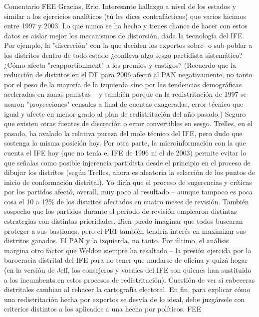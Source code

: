 \documentclass[letter,12pt]{article}
\begin{document}
Comentario FEE Gracias, Eric.  Interesante hallazgo a nivel de los estados y similar a los ejercicios analíticos (tú les dices contrafácticos) que varios hicimos entre 1997 y 2003.  Lo que nunca se ha hecho y tienes chance de hacer con estos datos es aislar mejor los mecanismos de distorsión, dada la tecnología del IFE.  Por ejemplo, la "discreción" con la que deciden los expertos sobre- o sub-poblar a los distritos dentro de todo estado ¿conlleva algo sesgo partidista sistemático?  ¿Cómo afecta "reapportionment" a los premios y castigos? (Recuerdo que la reducción de distritos en el DF para 2006 afectó al PAN negativamente, no tanto por el peso de la mayoría de la izquierda sino por las tendencias demográficas aceleradas en zonas panistas -- y también porque en la redistritación de 1997 se usaron "proyecciones" censales a final de cuentas exageradas, error técnico que igual y afecte en menor grado al plan de redistritación del año pasado.)  Seguro que existen otras fuentes de discreción o error convertibles en sesgo.  Trelles, en el pasado, ha avalado la relativa pureza del mole técnico del IFE, pero dudo que sostenga la misma posición hoy.  Por otra parte, la microinformación con la que cuenta el IFE hoy (que no tenía el IFE de 1996 ni el de 2003) permite evitar lo que señalas como posible injerencia partidista desde el principio en el proceso de dibujar los distritos (según Trelles, ahora es aleatoria la selección de los puntos de inicio de conformación   distrital).  Yo diría que el proceso de sugerencias y críticas por los partidos afectó, overall, muy poco al resultado -- aunque tampoco es poca cosa el 10 a 12\% de los distritos afectados en cuatro meses de revisión. También sospecho que los partidos durante el período de revisión emplearon distintas estrategias con distintas prioridades.  Bien puedo imaginar que todos buscaran proteger a sus bastiones, pero el PRI también tendría interés en maximizar sus distritos ganados.  El PAN y la izquierda, no tanto.  Por último, el análisis margina otro factor que Weldon siempre ha resaltado -- la presión ejercida por la burocracia distrital del IFE para no tener que mudarse de oficina y quizá hogar (en la versión de Jeff, los consejeros y vocales del IFE son quienes han sustituido a los incumbents en estos procesos de redistritación).  Cuestión de ver si cabeceras distritales cambian al rehacer la cartografía electoral.  En fin, para explicar cómo una redistritación hecha por expertos se desvía de lo ideal, debe juzgársele con criterios distintos a los aplicados a una hecha por políticos.  FEE
\end{document}

